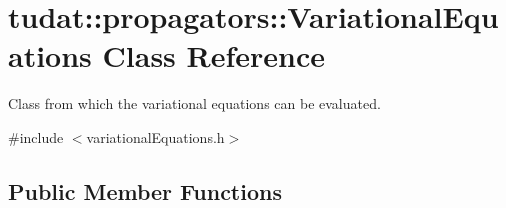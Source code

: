 \hypertarget{classtudat_1_1propagators_1_1VariationalEquations}{}\section{tudat\+:\+:propagators\+:\+:Variational\+Equations Class Reference}
\label{classtudat_1_1propagators_1_1VariationalEquations}


Class from which the variational equations can be evaluated.  




{\ttfamily \#include $<$variational\+Equations.\+h$>$}

\subsection*{Public Member Functions}

